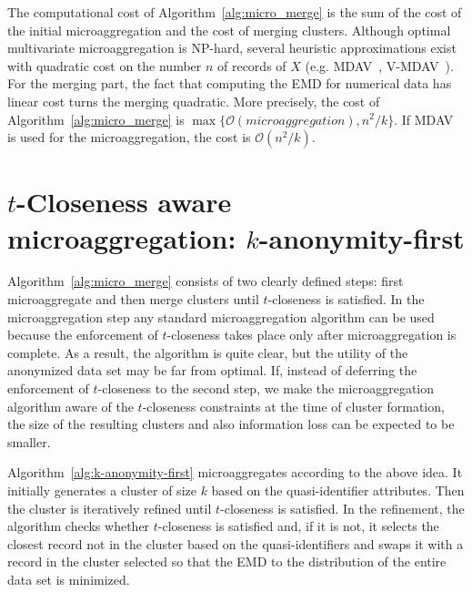 \documentclass[10pt,journal,compsoc]{IEEEtran}
\theoremstyle{definition}
\theoremstyle{plain}
\begin{document}
The computational cost of Algorithm~\ref{alg:micro_merge} is the sum of the cost of the initial
microaggregation and the cost of merging clusters. 
Although optimal multivariate microaggregation is NP-hard, 
several heuristic approximations exist with quadratic cost 
on the number $n$ of records
of $X$ (e.g. MDAV~\cite{Domingo2005Ordinal}, V-MDAV~\cite{Solanas2006Vmdav}). For the merging
part, the fact that computing the EMD for numerical data has linear cost turns the merging 
quadratic. 
More precisely, the cost of Algorithm~\ref{alg:micro_merge} is 
$\max\{\mathcal{O}(microaggregation),n^2/k\}$. If MDAV is used for the microaggregation, the 
cost is $\mathcal{O}(n^2/k)$.

\section{$t$-Closeness aware microaggregation: $k$-anonymity-first\label{sub:k-anonymity-first}}

Algorithm~\ref{alg:micro_merge} consists of two clearly defined steps: first
microaggregate and then merge clusters until $t$-closeness
is satisfied. In the microaggregation step any standard microaggregation
algorithm can be used because the enforcement of $t$-closeness
takes place only after microaggregation is complete. As a result,
the algorithm is quite clear, but the utility of the anonymized data
set may be far from optimal. If, instead of deferring the enforcement of
$t$-closeness to the second step, we make the microaggregation algorithm
aware of the $t$-closeness constraints at the time 
of cluster formation,
the size of the resulting clusters and also information loss 
can be expected to be smaller.

Algorithm~\ref{alg:k-anonymity-first} microaggregates according
to the above idea.
It initially generates a cluster of size $k$ based on the quasi-identifier
attributes. Then the cluster is iteratively refined until $t$-closeness
is satisfied. In the refinement, the algorithm checks whether 
$t$-closeness is satisfied
and, if it is not, it selects the closest record not in the cluster based
on the quasi-identifiers and swaps it with a record in the cluster
selected
so that the EMD to the distribution of the entire data set is minimized. 
\end{document}
